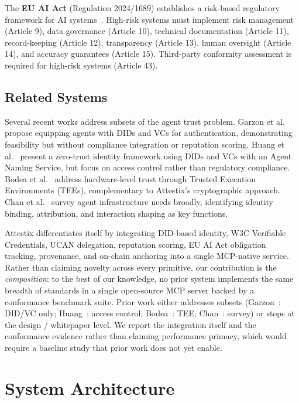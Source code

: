\documentclass[conference]{IEEEtran}
\begin{document}
The \textbf{EU AI Act} (Regulation 2024/1689) establishes a risk-based regulatory framework for AI systems~\cite{euaiact2024}. High-risk systems must implement risk management (Article 9), data governance (Article 10), technical documentation (Article 11), record-keeping (Article 12), transparency (Article 13), human oversight (Article 14), and accuracy guarantees (Article 15). Third-party conformity assessment is required for high-risk systems (Article 43).

\subsection{Related Systems}

Several recent works address subsets of the agent trust problem. Garzon et al.~\cite{garzon2025agents} propose equipping agents with DIDs and VCs for authentication, demonstrating feasibility but without compliance integration or reputation scoring. Huang et al.~\cite{huang2025zerotrust} present a zero-trust identity framework using DIDs and VCs with an Agent Naming Service, but focus on access control rather than regulatory compliance. Bodea et al.~\cite{bodea2025trusted} address hardware-level trust through Trusted Execution Environments (TEEs), complementary to Attestix's cryptographic approach. Chan et al.~\cite{chan2025infrastructure} survey agent infrastructure needs broadly, identifying identity binding, attribution, and interaction shaping as key functions.

Attestix differentiates itself by integrating DID-based identity, W3C Verifiable Credentials, UCAN delegation, reputation scoring, EU AI Act obligation tracking, provenance, and on-chain anchoring into a single MCP-native service. Rather than claiming novelty across every primitive, our contribution is the \emph{composition}: to the best of our knowledge, no prior system implements the same breadth of standards in a single open-source MCP server backed by a conformance benchmark suite. Prior work either addresses subsets (Garzon~\cite{garzon2025agents}: DID/VC only; Huang~\cite{huang2025zerotrust}: access control; Bodea~\cite{bodea2025trusted}: TEE; Chan~\cite{chan2025infrastructure}: survey) or stops at the design / whitepaper level. We report the integration itself and the conformance evidence rather than claiming performance primacy, which would require a baseline study that prior work does not yet enable.

\section{System Architecture}
\label{sec:architecture}
\end{document}

